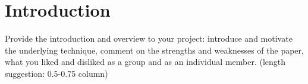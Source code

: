 \section{Introduction}
\label{sec:introduction}

Provide the introduction and overview to your project: introduce and motivate the underlying technique, comment on the strengths and weaknesses of the paper, what you liked and disliked as a group and as an individual member. (length suggestion: 0.5-0.75 column)


